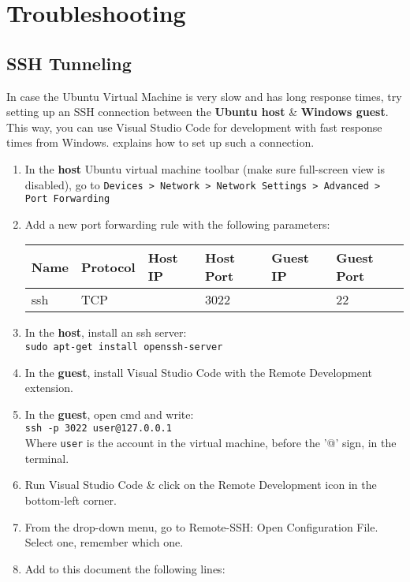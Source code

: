 \documentclass[10pt]{article}
\begin{document}
\section{Troubleshooting}
\subsection{SSH Tunneling}
In case the Ubuntu Virtual Machine is very slow and has long response times, try setting up an SSH connection between the \textbf{Ubuntu host} \& \textbf{Windows guest}. This way, you can use Visual Studio Code for development with fast response times from Windows. \href{https://stackoverflow.com/questions/5906441/how-to-ssh-to-a-virtualbox-guest-externally-through-a-host}{\color{blue}{This post}} explains how to set up such a connection.
\begin{enumerate}
    \item In the \textbf{host} Ubuntu virtual machine toolbar (make sure full-screen view is disabled), go to \texttt{Devices > Network > Network Settings > Advanced > Port Forwarding}
    \item Add a new port forwarding rule with the following parameters: \\
    \begin{tabular}{|l|l|l|l|l|l|}
        \hline
        Name & Protocol & Host IP & Host Port & Guest IP & Guest Port \\ \hline
        ssh & TCP & & 3022 & & 22 \\ \hline 
    \end{tabular}
    \item In the \textbf{host}, install an ssh server: \\
    \texttt{sudo apt-get install openssh-server}
    \item In the \textbf{guest}, install Visual Studio Code with the Remote Development extension.
    \item In the \textbf{guest}, open cmd and write: \\
    \texttt{ssh -p 3022 user@127.0.0.1} \\
    Where \texttt{user} is the account in the virtual machine, before the '@' sign, in the terminal.
    \item Run Visual Studio Code \& click on the Remote Development icon in the bottom-left corner.
    \item From the drop-down menu, go to Remote-SSH: Open Configuration File. Select one, remember which one.
    \item Add to this document the following lines: \\

\end{enumerate}
\end{document}
